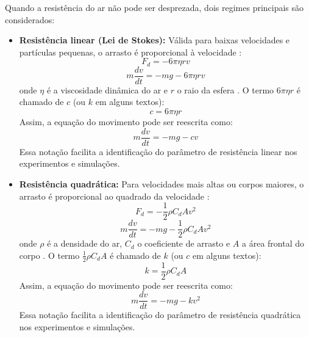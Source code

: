 Quando a resistência do ar não pode ser desprezada, dois regimes principais são considerados:

\begin{itemize}
    \item \textbf{Resistência linear (Lei de Stokes):} Válida para baixas velocidades e partículas pequenas, o arrasto é proporcional à velocidade \cite{batchelor2000,butcher2016}:
    \begin{equation}
        F_d = -6 \pi \eta r v
    \end{equation}
    \begin{equation}
        m \frac{dv}{dt} = -mg - 6\pi\eta r v
    \end{equation}
    onde $\eta$ é a viscosidade dinâmica do ar e $r$ o raio da esfera \cite{batchelor2000,butcher2016}. O termo $6\pi\eta r$ é chamado de $c$ (ou $k$ em alguns textos):
    \begin{equation}
        c = 6\pi\eta r
    \end{equation}
    Assim, a equação do movimento pode ser reescrita como:
    \begin{equation}
        m \frac{dv}{dt} = -mg - c v
    \end{equation}
    Essa notação facilita a identificação do parâmetro de resistência linear nos experimentos e simulações.
    
    \item \textbf{Resistência quadrática:} Para velocidades mais altas ou corpos maiores, o arrasto é proporcional ao quadrado da velocidade \cite{batchelor2000,butcher2016}:
    \begin{equation}
        F_d = -\frac{1}{2} \rho C_d A v^2
    \end{equation}
    \begin{equation}
        m \frac{dv}{dt} = -mg - \frac{1}{2} \rho C_d A v^2
    \end{equation}
    onde $\rho$ é a densidade do ar, $C_d$ o coeficiente de arrasto e $A$ a área frontal do corpo \cite{batchelor2000}. O termo $\frac{1}{2} \rho C_d A$ é chamado de $k$ (ou $c$ em alguns textos):
    \begin{equation}
        k = \frac{1}{2} \rho C_d A
    \end{equation}
    Assim, a equação do movimento pode ser reescrita como:
    \begin{equation}
        m \frac{dv}{dt} = -mg - k v^2
    \end{equation}
    Essa notação facilita a identificação do parâmetro de resistência quadrática nos experimentos e simulações.
\end{itemize}

